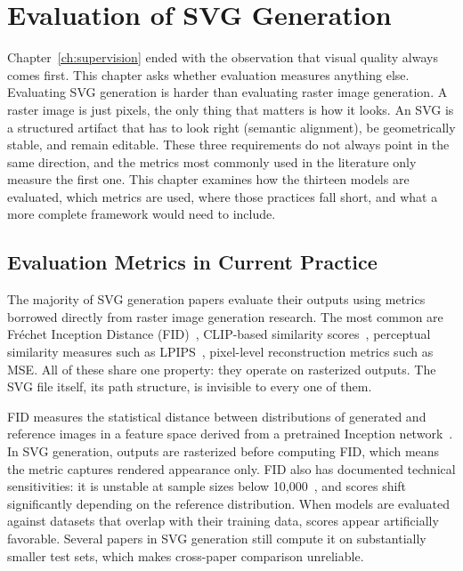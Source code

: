 \chapter{Evaluation of SVG Generation}
\label{ch:Evaluation}

Chapter~\ref{ch:supervision} ended with the observation that visual quality 
always comes first. This chapter asks whether evaluation measures anything else.
Evaluating SVG generation is harder than evaluating raster 
image generation. A raster image is just pixels, the only thing that matters is how it looks.
An SVG is a structured artifact 
that has to look right (semantic alignment), be geometrically stable, and remain 
editable. These three requirements do not always point in 
the same direction, and the metrics most commonly used in 
the literature only measure the first one. 
This chapter examines how the thirteen models are evaluated, which metrics are used, where those practices 
fall short, and what a more complete framework would need 
to include.

\section{Evaluation Metrics in Current Practice}
\label{sec:current_eval}

The majority of SVG generation papers evaluate their outputs 
using metrics borrowed directly from raster image generation 
research. The most common are Fréchet Inception Distance 
(FID)~\cite{heuselGANsTrainedTwo2017}, CLIP-based similarity 
scores~\cite{radfordLearningTransferableVisual2021}, 
perceptual similarity measures such as 
LPIPS~\cite{zhangUnreasonableEffectivenessDeep2018}, 
pixel-level reconstruction metrics such as MSE.
All of these share one property: they 
operate on rasterized outputs. The SVG file itself, its 
path structure, is invisible to every one of them.

FID measures the statistical distance between 
distributions of generated and reference images in a feature 
space derived from a pretrained Inception 
network~\cite{szegedy2016rethinking}. In SVG generation, outputs 
are rasterized before computing FID, which means the metric 
captures rendered appearance only. FID also has documented 
technical sensitivities: it is unstable at sample sizes below 
10,000~\cite{heuselGANsTrainedTwo2017}, and scores shift 
significantly depending on the reference distribution. When 
models are evaluated against datasets that overlap with their 
training data, scores appear artificially favorable. Several papers 
in SVG generation still compute it on substantially 
smaller test sets, which makes cross-paper comparison unreliable.

